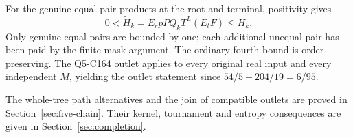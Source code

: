For the genuine equal-pair products at the root and terminal, positivity gives
\[
 0<\widetilde H_k=E_r pP Q_k T^L(E_tF)\le H_k.
\]
Only genuine equal pairs are bounded by one; each additional unequal pair has been paid by the finite-mask argument. The ordinary fourth bound is order preserving. The Q5-C164 outlet applies to every original real input and every independent \(M\), yielding the outlet statement since \(54/5-204/19=6/95\).

The whole-tree path alternatives and the join of compatible outlets
are proved in Section~\ref{sec:five-chain}. Their kernel, tournament
and entropy consequences are given in Section~\ref{sec:completion}.
